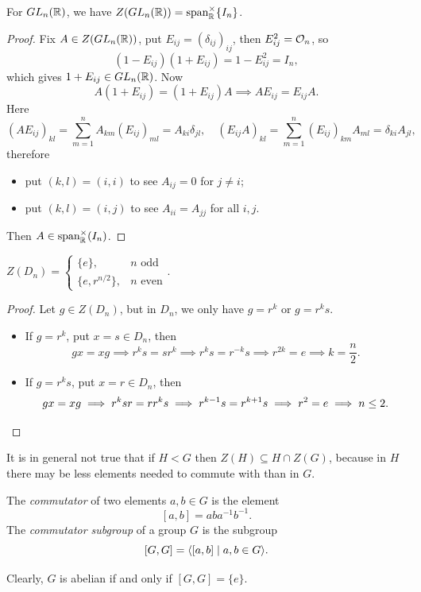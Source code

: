 \begin{example}
  For \(GL_n(\mathbb{R})\), we have \(Z(GL_n(\mathbb{R})) = \operatorname{span}_{\mathbb{R}}^\times\{I_n\}\).
\end{example}
\begin{proof}
  Fix \(A\in Z(GL_n(\mathbb{R}))\), put \(E_{ij} = (\delta_{ij})_{ij}\), then \(E_{ij}^2 = \mathcal{O}_n\), so \[
    (1 - E_{ij})(1 + E_{ij}) = 1 - E_{ij}^2 = I_n,
  \] which gives \(1 + E_{ij}\in GL_n(\mathbb{R})\). Now \[
    A(1 + E_{ij}) = (1 + E_{ij})A \implies AE_{ij} = E_{ij}A.
  \] Here \[
    (AE_{ij})_{kl} = \sum_{m=1}^n A_{km}(E_{ij})_{ml} = A_{ki}\delta_{jl}, \quad
    (E_{ij}A)_{kl} = \sum_{m=1}^n (E_{ij})_{km}A_{ml} = \delta_{ki}A_{jl},
  \] therefore \begin{itemize}
    \item put \((k,l) = (i,i)\) to see \(A_{ij} = 0\) for \(j\neq i\);
    \item put \((k,l) = (i,j)\) to see \(A_{ii} = A_{jj}\) for all \(i,j\).
  \end{itemize} Then \(A\in\operatorname{span}^\times_{\mathbb{R}}(I_n)\).
\end{proof}

\begin{example}
  \(Z(D_n) = \begin{cases}
    \{e\}, & n \text{ odd} \\
    \{e,r^{n/2}\}, & n \text{ even}
  \end{cases}\).
\end{example}
\begin{proof}
  Let \(g\in Z(D_n)\), but in \(D_n\), we only have \(g = r^k\) or \(g = r^ks\).
  \begin{itemize}
    \item If \(g = r^k\), put \(x = s\in D_n\), then \[
      gx = xg \implies r^ks = sr^k \implies r^ks = r^{-k}s \implies r^{2k} = e \implies k = \frac{n}{2}.
    \]
    \item If \(g = r^ks\), put \(x = r\in D_n\), then \[
      gx = xg \implies r^ksr = rr^ks \implies r^{k-1}s = r^{k+1}s \implies r^2 = e \implies n\leq 2. \qedhere
    \]
  \end{itemize}
\end{proof}


It is in general not true that if \(H < G\) then \(Z(H) \subseteq H\cap Z(G)\), because in \(H\) there may be less elements needed to commute with than in \(G\).

\newpage
\begin{definition}
  The \emph{commutator} of two elements \(a,b\in G\) is the element \[
    [a,b] = aba^{-1}b^{-1}.
  \]
  The \emph{commutator subgroup} of a group \(G\) is the subgroup \[
    [G,G] = \langle[a,b] \mid a,b\in G\rangle.
  \]
\end{definition}
Clearly, \(G\) is abelian if and only if \([G,G] = \{e\}\).

